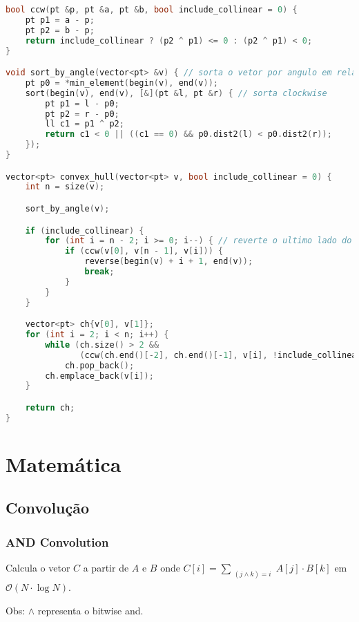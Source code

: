 \documentclass[10pt, a4paper, oneside]{book}
\begin{document}
\begin{lstlisting}[language=C++]
bool ccw(pt &p, pt &a, pt &b, bool include_collinear = 0) {
    pt p1 = a - p;
    pt p2 = b - p;
    return include_collinear ? (p2 ^ p1) <= 0 : (p2 ^ p1) < 0;
}

void sort_by_angle(vector<pt> &v) { // sorta o vetor por angulo em relacao ao pivo
    pt p0 = *min_element(begin(v), end(v));
    sort(begin(v), end(v), [&](pt &l, pt &r) { // sorta clockwise
        pt p1 = l - p0;
        pt p2 = r - p0;
        ll c1 = p1 ^ p2;
        return c1 < 0 || ((c1 == 0) && p0.dist2(l) < p0.dist2(r));
    });
}

vector<pt> convex_hull(vector<pt> v, bool include_collinear = 0) {
    int n = size(v);

    sort_by_angle(v);

    if (include_collinear) {
        for (int i = n - 2; i >= 0; i--) { // reverte o ultimo lado do poligono
            if (ccw(v[0], v[n - 1], v[i])) {
                reverse(begin(v) + i + 1, end(v));
                break;
            }
        }
    }

    vector<pt> ch{v[0], v[1]};
    for (int i = 2; i < n; i++) {
        while (ch.size() > 2 &&
               (ccw(ch.end()[-2], ch.end()[-1], v[i], !include_collinear)))
            ch.pop_back();
        ch.emplace_back(v[i]);
    }

    return ch;
}\end{lstlisting}
\hfill

\newpage

%
%
%
%

\chapter{Matemática}

\section{Convolução}
\subsection{AND Convolution}


Calcula o vetor $C$ a partir de $A$ e $B$ onde $C[i] = \sum_{\substack{(j \land k) = i}} A[j] \cdot B[k]$ em $\mathcal{O}(N \cdot \log N)$.



Obs: $\land$ representa o bitwise and.
\end{document}
